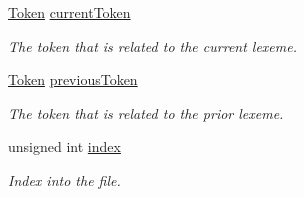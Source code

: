 \begin{DoxyCompactItemize}
\hypertarget{class_lexer_af0484f3df6124444ce846bdfb5c0d14f}{}\label{class_lexer_af0484f3df6124444ce846bdfb5c0d14f} 
\hyperlink{_lexer_8h_a6a9e93b081bad7fc74c17306fb168c1f}{Token} \hyperlink{class_lexer_af0484f3df6124444ce846bdfb5c0d14f}{current\+Token}
\begin{DoxyCompactList}\small\item\em The token that is related to the current lexeme. \end{DoxyCompactList}\item 
\hypertarget{class_lexer_a6c351275177d71410545283a0d470021}{}\label{class_lexer_a6c351275177d71410545283a0d470021} 
\hyperlink{_lexer_8h_a6a9e93b081bad7fc74c17306fb168c1f}{Token} \hyperlink{class_lexer_a6c351275177d71410545283a0d470021}{previous\+Token}
\begin{DoxyCompactList}\small\item\em The token that is related to the prior lexeme. \end{DoxyCompactList}\item 
\hypertarget{class_lexer_aa7d95630ef9e53f6bdc5a9386420b343}{}\label{class_lexer_aa7d95630ef9e53f6bdc5a9386420b343} 
unsigned int \hyperlink{class_lexer_aa7d95630ef9e53f6bdc5a9386420b343}{index}
\begin{DoxyCompactList}\small\item\em Index into the file. \end{DoxyCompactList}\end{DoxyCompactItemize}


